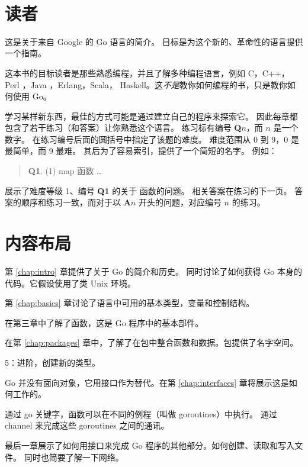 {\textit{}\\ \textsc{}}

\section{读者}
\noindent{}这是关于来自 Google 的 Go 语言的简介。
目标是为这个新的、革命性的语言提供一个指南。

这本书的目标读者是那些熟悉编程，并且了解多种编程语言，例如 C\cite{c}，C++\cite{c++}，
Perl \cite{perl}，Java \cite{java}，Erlang\cite{erlang}，Scala\cite{scala}，
Haskell\cite{haskell}。这\emph{不是}教你如何编程的书，只是教你如何使用 Go。

学习某样新东西，最佳的方式可能是通过建立自己的程序来探索它。
因此每章都包含了若干练习（和答案）让你熟悉这个语言。
练习标有编号 \textbf{Q$n$}，而 $n$ 是一个数字。 
在练习编号后面的圆括号中指定了该题的难度。
难度范围从 0 到 9，0 是最简单，而 9 最难。
其后为了容易索引，提供了一个简短的名字。
例如：
\begin{verse}
\textbf{Q1}. (1) map 函数 \ldots
\end{verse}
展示了难度等级 1、编号 \textbf{Q1} 的关于  函数的问题。
相关答案在练习的下一页。
答案的顺序和练习一致，而对于以 \textbf{A$n$} 开头的问题，对应编号 $n$ 的练习。

\section{内容布局}
第 \ref{chap:intro} 章提供了关于 Go 的简介和历史。
同时讨论了如何获得 Go 本身的代码。它假设使用了类 Unix 环境。

第 \ref{chap:basics} 章讨论了语言中可用的基本类型，变量和控制结构。

在第三章中了解了函数，这是 Go 程序中的基本部件。

在第 \ref{chap:packages} 章中，了解了在包中整合函数和数据。包提供了名字空间。

5：进阶，创建新的类型。

Go 并没有面向对象，它用接口作为替代。在第 \ref{chap:interfaces} 章将展示这是如何工作的。

通过 go 关键字，函数可以在不同的例程（叫做 goroutines）中执行。
通过 channel 来完成这些 goroutines 之间的通讯。

最后一章展示了如何用接口来完成 Go 程序的其他部分。如何创建、读取和写入文件。
同时也简要了解一下网络。

